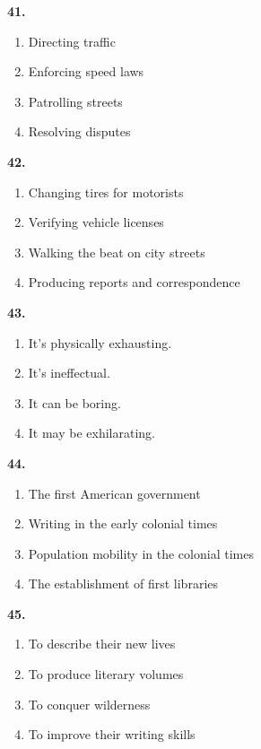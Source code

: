 \documentclass[12pt]{article}
\begin{document}
\par
\vspace{0.25\baselineskip}
\noindent\textbf{41.}
\begin{enumerate}[label=(\Alph*),leftmargin=*,itemsep=0.2em]
\item Directing traffic
\item Enforcing speed laws
\item Patrolling streets
\item Resolving disputes
\end{enumerate}
\par
\vspace{0.25\baselineskip}
\noindent\textbf{42.}
\begin{enumerate}[label=(\Alph*),leftmargin=*,itemsep=0.2em]
\item Changing tires for motorists
\item Verifying vehicle licenses
\item Walking the beat on city streets
\item Producing reports and correspondence
\end{enumerate}
\par
\vspace{0.25\baselineskip}
\noindent\textbf{43.}
\begin{enumerate}[label=(\Alph*),leftmargin=*,itemsep=0.2em]
\item It's physically exhausting.
\item It's ineffectual.
\item It can be boring.
\item It may be exhilarating.
\end{enumerate}
\par
\vspace{0.25\baselineskip}
\noindent\textbf{44.}
\begin{enumerate}[label=(\Alph*),leftmargin=*,itemsep=0.2em]
\item The first American government
\item Writing in the early colonial times
\item Population mobility in the colonial times
\item The establishment of first libraries
\end{enumerate}
\par
\vspace{0.25\baselineskip}
\noindent\textbf{45.}
\begin{enumerate}[label=(\Alph*),leftmargin=*,itemsep=0.2em]
\item To describe their new lives
\item To produce literary volumes
\item To conquer wilderness
\item To improve their writing skills
\end{enumerate}
\end{document}
